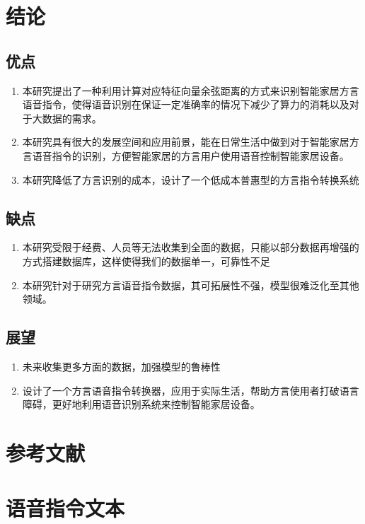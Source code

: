 \documentclass[lang=cn,cite=super]{elegantpaper}
\begin{document}
\section{结论}
\subsection{优点}
\begin{enumerate}
    \item 本研究提出了一种利用计算对应特征向量余弦距离的方式来识别智能家居方言语音指令，使得语音识别在保证一定准确率的情况下减少了算力的消耗以及对于大数据的需求。
    \item 本研究具有很大的发展空间和应用前景，能在日常生活中做到对于智能家居方言语音指令的识别，方便智能家居的方言用户使用语音控制智能家居设备。
    \item 本研究降低了方言识别的成本，设计了一个低成本普惠型的方言指令转换系统 
\end{enumerate}
\subsection{缺点}
\begin{enumerate}
    \item 本研究受限于经费、人员等无法收集到全面的数据，只能以部分数据再增强的方式搭建数据库，这样使得我们的数据单一，可靠性不足
    \item 本研究针对于研究方言语音指令数据，其可拓展性不强，模型很难泛化至其他领域。
\end{enumerate}
\subsection{展望}
\begin{enumerate}
    \item 未来收集更多方面的数据，加强模型的鲁棒性
    \item 设计了一个方言语音指令转换器，应用于实际生活，帮助方言使用者打破语言障碍，更好地利用语音识别系统来控制智能家居设备。 
\end{enumerate}
\newpage
\section*{参考文献}

\newpage
\appendix
\section{语音指令文本}
\label{appendix:A}
\end{document}
